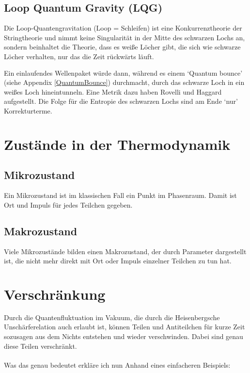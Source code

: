 \documentclass[ngerman]{scrartcl}
\begin{document}
	\subsection{Loop Quantum Gravity (LQG)}	%
Die Loop-Quantengravitation (Loop = Schleifen) ist eine Konkurrenztheorie der Stringtheorie und nimmt keine Singularität in der Mitte des schwarzen Lochs an, sondern beinhaltet die Theorie, dass es weiße Löcher gibt, die sich wie schwarze Löcher verhalten, nur das die Zeit rückwärts läuft. 

Ein einlaufendes Wellenpaket würde dann, während es einem `Quantum bounce' (siehe Appendix
\ref{QuantumBounce}) durchmacht, durch das schwarze Loch in ein weißes Loch hineintunneln. Eine Metrik dazu haben Rovelli und Haggard \cite{LQGRovelli} aufgestellt. Die Folge für die Entropie des schwarzen Lochs sind am Ende `nur' Korrekturterme.


\appendix
\section{Zustände in der Thermodynamik}

\subsection*{Mikrozustand}
Ein Mikrozustand ist im klassischen Fall ein Punkt im Phasenraum. Damit ist Ort und Impuls für jedes Teilchen gegeben.

\subsection*{Makrozustand}
Viele Mikrozustände bilden einen Makrozustand, der durch Parameter dargestellt ist, die nicht mehr direkt mit Ort oder Impuls einzelner Teilchen zu tun hat.

\section{Verschränkung} \label{Verschränkung}
	Durch die Quantenfluktuation im Vakuum, die durch die Heisenbergsche Unschärferelation auch erlaubt ist, können Teilen und Antiteilchen für kurze Zeit sozusagen aus dem Nichts entstehen und wieder verschwinden. Dabei sind genau diese Teilen verschränkt.
	\\ \\
	Was das genau bedeutet erkläre ich nun Anhand eines einfacheren Beispiels:
	
\end{document}
